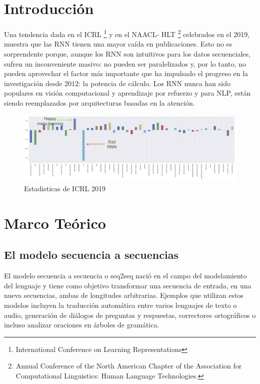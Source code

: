 \documentclass[conference]{IEEEtran}
\begin{document}
\section{Introducci\'on}
Una tendencia dada en el ICRL \footnote{International Conference on Learning Representations } y en el NAACL- HLT \footnote{Annual Conference of the North American Chapter of the Association for Computational Linguistics: Human Language Technologies.} celebrados en el 2019,  muestra que las  RNN tienen una mayor ca\'ida en publicaciones. Esto no es sorprendente porque, aunque los RNN son intuitivos para los datos secuenciales, sufren un inconveniente masivo: no pueden ser paralelizados y, por lo tanto, no pueden aprovechar el factor m\'as importante que ha impulsado el progreso en la investigaci\'on desde $2012$: la potencia de c\'alculo. Los RNN nunca han sido populares en visi\'on computacional y aprendizaje por refuerzo y para NLP, est\'an siendo reemplazados por arquitecturas basadas en la atenci\'on.

\begin{figure}[h]
	\centering
	\includegraphics[scale=.2]{imagenes/rnn.png}
	\caption{Estadisticas de ICRL 2019} 
\end{figure}




\section{Marco Te\'orico}

\subsection{El modelo secuencia a secuencias}
El modelo secuencia a secuencia o seq2seq naci\'o en el campo del modelamiento del lenguaje \cite{b6} y tiene como objetivo transformar una secuencia de entrada, en una nueva secuencias, ambas de longitudes arbitrarias. Ejemplos que utilizan estos modelos  incluyen la traducci\'on autom\'atica entre varios lenguajes de texto o audio, generaci\'on de di\'alogos de preguntas y respuestas, correctores ortogr\'aficos o incluso analizar oraciones en \'arboles de gram\'atica.
\end{document}
